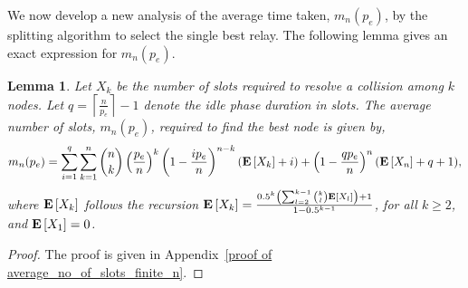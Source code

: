 \documentclass[12pt,draftcls,peerreview, onecolumn]{IEEEtran}
\newtheorem{lemma}{{\bf Lemma}}
\newcommand{\ceil}[1]{\left\lceil {#1} \right\rceil}
\newcommand{\expect}[1]{{\bf E}\left[{#1}\right]}
\newcommand{\EX}[1]{\expect{X_{#1}}}
\newcommand{\aveslots}[1]{m_{#1}}
\begin{document}
We now develop a new analysis of the average time taken,
$\aveslots{n}(p_e)$, by the splitting algorithm to select the single
best relay. The following lemma gives an exact expression for
$\aveslots{n}(p_e)$.
\begin{lemma}
\label{average_no_of_slots_finite_n}
Let $X_k$ be the number of slots required to resolve a collision among
$k$ nodes.  Let $q = \ceil{\frac{n}{p_e}}-1$ denote the idle phase
duration in slots. The average number of slots, $\aveslots{n}(p_e)$,
required to find the best node is given by,
\begin{equation} \label{eq:finite_nodes}
 \aveslots{n}(p_e) =\sum_{i=1}^q\sum_{k=1}^n  \binom{n}{k}  \left(\frac{p_e}{n}\right)^k
  \left(1-\frac{ip_e}{n}\right)^{n-k}  \left(\EX{k}+i\right)
  + \left(1-\frac{qp_e}{n}\right)^n (\EX{n} + q+1),
\end{equation}
where $\EX{k}$ follows the recursion $\EX{k} =
\frac{0.5^k\left(\sum_{l=2}^{k-1}
    \binom{k}{l}\EX{l}\right)+1}{1-0.5^{k-1}}$, for all $k \ge 2$, and
$\EX{1} = 0$.
\end{lemma}
\begin{proof}
The proof is given in Appendix~\ref{proof of average_no_of_slots_finite_n}.
\end{proof}
\end{document}
